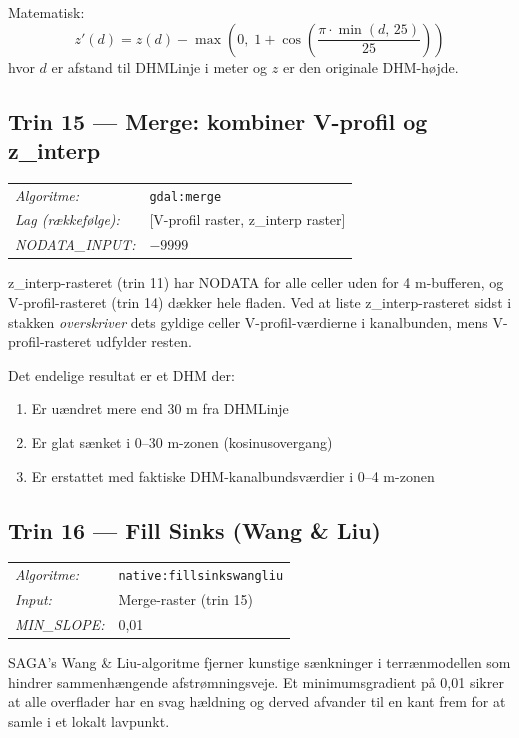 Matematisk:
\[
  z'(d) = z(d) - \max\!\left(0,\; 1 + \cos\!\left(\frac{\pi \cdot \min(d,\,25)}{25}\right)\right)
\]
hvor $d$ er afstand til DHMLinje i meter og $z$ er den originale DHM-højde.

\subsection{Trin 15 — Merge: kombiner V-profil og z\_interp}

\begin{tabular}{ll}
  \textit{Algoritme:}        & \texttt{gdal:merge} \\
  \textit{Lag (rækkefølge):} & {[V-profil raster, z\_interp raster]} \\
  \textit{NODATA\_INPUT:}    & $-9999$ \\
\end{tabular}

\medskip
z\_interp-rasteret (trin 11) har NODATA for alle celler uden for 4 m-bufferen,
og V-profil-rasteret (trin 14) dækker hele fladen. Ved at liste z\_interp-rasteret
sidst i stakken \emph{overskriver} dets gyldige celler V-profil-værdierne i
kanalbunden, mens V-profil-rasteret udfylder resten.

Det endelige resultat er et DHM der:
\begin{enumerate}
  \item Er uændret mere end 30 m fra DHMLinje
  \item Er glat sænket i 0–30 m-zonen (kosinusovergang)
  \item Er erstattet med faktiske DHM-kanalbundsværdier i 0–4 m-zonen
\end{enumerate}

\subsection{Trin 16 — Fill Sinks (Wang \& Liu)}

\begin{tabular}{ll}
  \textit{Algoritme:}  & \texttt{native:fillsinkswangliu} \\
  \textit{Input:}      & Merge-raster (trin 15) \\
  \textit{MIN\_SLOPE:} & 0,01 \\
\end{tabular}

\medskip
SAGA's Wang \& Liu-algoritme fjerner kunstige sænkninger i terrænmodellen som
hindrer sammenhængende afstrømningsveje. Et minimumsgradient på 0,01 sikrer at
alle overflader har en svag hældning og derved afvander til en kant frem for at
samle i et lokalt lavpunkt.


